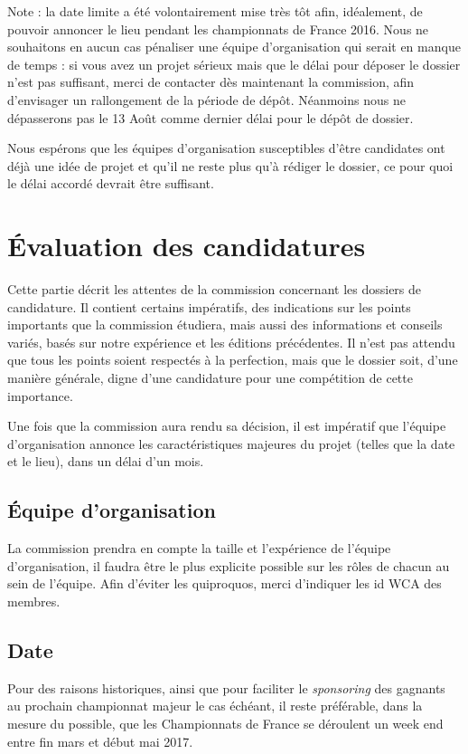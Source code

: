 \documentclass[a4paper,12pt]{scrartcl}
\begin{document}
Note : la date limite a été volontairement mise très tôt afin, idéalement, de
pouvoir annoncer le lieu pendant les championnats de France 2016. Nous ne souhaitons
en aucun cas pénaliser une équipe d'organisation qui serait en manque de temps :
si vous avez un projet sérieux mais que le délai pour déposer le dossier n'est pas
suffisant, merci de contacter dès maintenant la commission, afin d'envisager un
rallongement de la période de dépôt. Néanmoins nous ne dépasserons pas le 13 Août comme dernier délai
pour le dépôt de dossier.

Nous espérons que les équipes d'organisation susceptibles d'être candidates ont
déjà une idée de projet et qu'il ne reste plus qu'à rédiger le dossier, ce pour
quoi le délai accordé devrait être suffisant.

\pagebreak
\section*{Évaluation des candidatures}

Cette partie décrit les attentes de la commission concernant les dossiers de candidature.
Il contient certains impératifs, des indications sur les points importants que la
commission étudiera, mais aussi des informations et conseils variés, basés sur
notre expérience et les éditions précédentes.  Il n’est pas attendu que tous
les points soient respectés à la perfection, mais que le dossier soit, d’une
manière générale, digne d’une candidature pour une compétition de cette importance.

Une fois que la commission aura rendu sa décision, il est impératif que l'équipe
d'organisation annonce les caractéristiques majeures du projet (telles que la date
et le lieu), dans un délai d'un mois.

\subsection*{Équipe d’organisation}


La commission prendra en compte la taille et l’expérience de l’équipe d’organisation, il faudra être le plus explicite possible sur les rôles de chacun au sein de l’équipe. Afin d’éviter les quiproquos, merci d’indiquer les id WCA des membres.


\subsection*{Date}

Pour des raisons historiques, ainsi que pour faciliter le \emph{sponsoring} des gagnants au prochain championnat majeur le cas échéant, il reste préférable, dans la mesure du possible, que les Championnats de France se déroulent un week end entre fin mars et début mai 2017.
\end{document}
